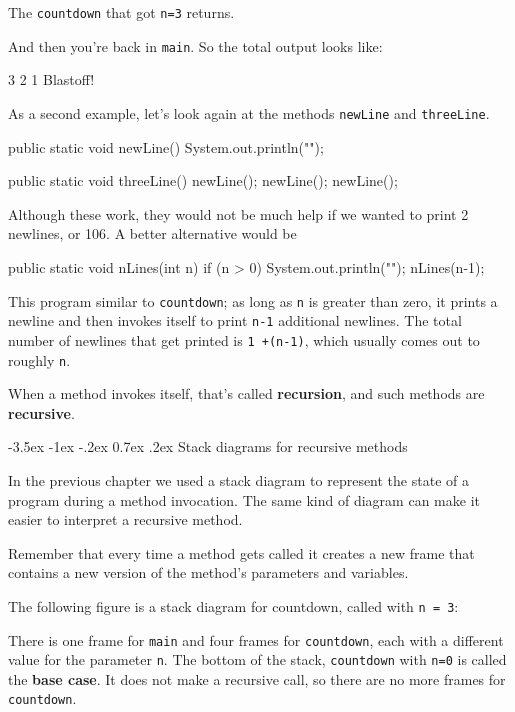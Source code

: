 \documentclass{book}
\makeatletter
\renewcommand{\section}{\@startsection 
    {section} {1} {0mm}%
    {-3.5ex \@plus -1ex \@minus -.2ex}%
    {0.7ex \@plus.2ex}%
    {\normalfont\Large\bfseries}}
\makeatother
\begin{document}
The {\tt countdown} that got {\tt n=3} returns.

\noindent And then you're back in {\tt main}.  So the
total output looks like:

\begin{verbatimtab}
3
2
1
Blastoff!
\end{verbatimtab}
%
As a second example, let's look again at the methods
{\tt newLine} and {\tt threeLine}.

\begin{verbatimtab}
  public static void newLine() {
    System.out.println("");
  }

  public static void threeLine() {
    newLine();  newLine();  newLine();
  }
\end{verbatimtab}
%
Although these work, they would not be much help if we wanted
to print 2 newlines, or 106.  A better alternative would be

\begin{verbatimtab}
  public static void nLines(int n) {
    if (n > 0) {
      System.out.println("");
      nLines(n-1);
    }
  }
\end{verbatimtab}
%
This program similar to {\tt countdown}; as long as {\tt n} is greater
than zero, it prints a newline and then invokes itself to
print {\tt n-1} additional newlines.  The total number
of newlines that get printed is {\tt 1 +(n-1)}, which usually
comes out to roughly {\tt n}.


When a method invokes itself, that's called {\bf recursion}, and
such methods are {\bf recursive}.


\section{Stack diagrams for recursive methods}

In the previous chapter we used a stack diagram to represent the
state of a program during a method invocation.  The same kind
of diagram can make it easier to interpret a recursive method.

Remember that every time a method gets called it creates
a new frame that contains a new version of
the method's parameters and variables.

The following figure is a stack diagram for countdown, called
with {\tt n = 3}:

% 
There is one frame for {\tt main} and four frames for {\tt countdown},
each with a different value for the parameter {\tt n}.  The bottom of
the stack, {\tt countdown} with {\tt n=0} is called the {\bf base
  case}.  It does not make a recursive call, so there are no more
frames for {\tt countdown}.
\end{document}
